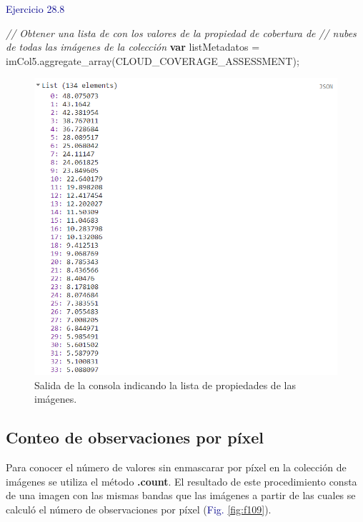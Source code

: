 \documentclass[
  12pt,
  letterpaper,
  twoside]{book}
\newenvironment{Shaded}{\begin{snugshade}}{\end{snugshade}}
\newcommand{\CommentTok}[1]{\textcolor[rgb]{0.24,0.58,0.00}{\textit{#1}}}
\newcommand{\ControlFlowTok}[1]{\textcolor[rgb]{0.00,0.00,0.00}{\textbf{#1}}}
\newcommand{\FunctionTok}[1]{\textcolor[rgb]{0.48,0.12,0.64}{#1}}
\newcommand{\NormalTok}[1]{#1}
\newcommand{\OperatorTok}[1]{\textcolor[rgb]{0.00,0.00,0.00}{#1}}
\newcommand{\StringTok}[1]{\textcolor[rgb]{0.87,0.29,0.22}{#1}}
\newcommand\boldpurple[1]{\textcolor{darkpurple}{\textbf{#1}}}
\begin{document}
\textcolor{darkblue}{Ejercicio 28.8}

\begin{Shaded}
\begin{Highlighting}[]
\CommentTok{// Obtener una lista de con los valores de la propiedad de cobertura de }
\CommentTok{// nubes de todas las imágenes de la colección}
\ControlFlowTok{var}\NormalTok{ listMetadatos }\OperatorTok{=}\NormalTok{ imCol5}\OperatorTok{.}\FunctionTok{aggregate\_array}\NormalTok{(}\StringTok{\textquotesingle{}CLOUD\_COVERAGE\_ASSESSMENT\textquotesingle{}}\NormalTok{)}\OperatorTok{;}
\end{Highlighting}
\end{Shaded}

\begin{figure}[H]

{\centering \includegraphics[width=0.8\linewidth]{Img/cloudCoverList} 

}

\caption{Salida de la consola indicando la lista de propiedades de las imágenes.}\label{fig:f108}
\end{figure}

\hypertarget{conteo-de-observaciones-por-puxedxel}{%
\subsection*{Conteo de observaciones por píxel}\label{conteo-de-observaciones-por-puxedxel}}

Para conocer el número de valores sin enmascarar por píxel en la colección de imágenes se utiliza el método \boldpurple{.count}. El resultado de este procedimiento consta de una imagen con las mismas bandas que las imágenes a partir de las cuales se calculó el número de observaciones por píxel (\textcolor{darkblue}{Fig.} \ref{fig:f109}).
\end{document}
